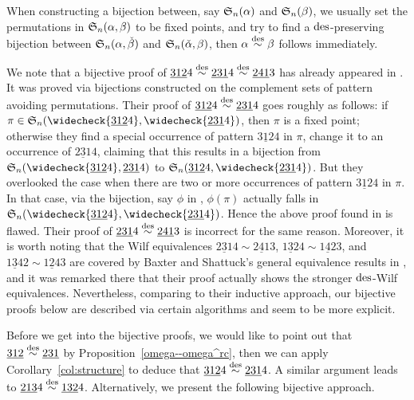 When constructing a bijection between, say $\S_n(\alpha)$ and $\S_n(\beta)$, we usually set the permutations in $\S_n(\alpha,\beta)$ to be fixed points, and try to find a $\des$-preserving bijection between $\S_n(\alpha,\check{\beta})$ and $\S_n(\check{\alpha},\beta)$, then $\alpha \overset{\des}{\sim }\beta$ follows immediately.

We note that a bijective proof of $\underline{312}4 \overset{\des}{\sim }\underline{231}4\overset{\des}{\sim }\underline{241}3$ has already appeared in \cite{BDGZ19}. It was proved via bijections constructed on the complement sets of pattern avoiding permutations. Their proof of $\underline{312}4 \overset{\des}{\sim }\underline{231}4$ goes roughly as follows: if $\pi \in \S_n(\widecheck{\underline{312}4},\widecheck{\underline{231}4})$,
then $\pi$ is a fixed point; otherwise they find a special occurrence of pattern $\underline{312}4$ in $\pi$, change it to an occurrence of $\underline{231}4$, claiming that this results in a bijection from $\S_n(\widecheck{\underline{312}4},\underline{231}4)$ to $\S_n(\underline{312}4,\widecheck{\underline{231}4})$. But they overlooked the case when there are two or more occurrences of pattern $\underline{312}4$ in $\pi$. In that case, via the bijection, say $\phi$ in \cite{BDGZ19}, $\phi(\pi)$ actually falls in $\S_n(\widecheck{\underline{312}4},\widecheck{\underline{231}4})$. Hence the above proof found in \cite{BDGZ19} is flawed. Their proof of $\underline{231}4\overset{\des}{\sim }\underline{241}3$ is incorrect for the same reason. Moreover, it is worth noting that the Wilf equivalences $\underline{231}4\sim\underline{241}3$, $\underline{132}4\sim\underline{142}3$, and $\underline{134}2\sim\underline{124}3$ are covered by Baxter and Shattuck's general equivalence results in \cite[Thm.~6 and Thm.~9]{BS15}, and it was remarked there that their proof actually shows the stronger $\des$-Wilf equivalences. Nevertheless, comparing to their inductive approach, our bijective proofs below are described via certain algorithms and seem to be more explicit.

Before we get into the bijective proofs, we would like to point out that $\underline{312} \overset{\des}{\sim }\underline{231} $ by Proposition~\ref{omega--omega^rc}, then we can apply Corollary~\ref{col:structure} to deduce that $\underline{312}4 \overset{\des}{\sim }\underline{231}4$. A similar argument leads to $\underline{213}4 \overset{\des}{\sim }\underline{132}4$. Alternatively, we present the following bijective approach. 

